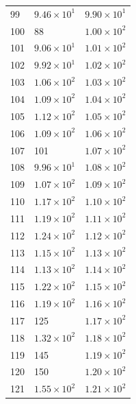 \begin{table}[H]
\begin{tabular}{lll}
99 & $\displaystyle 9.46 \times 10^{1}$ & $\displaystyle 9.90 \times 10^{1}$ \\
100 & 88 & $\displaystyle 1.00 \times 10^{2}$ \\
101 & $\displaystyle 9.06 \times 10^{1}$ & $\displaystyle 1.01 \times 10^{2}$ \\
102 & $\displaystyle 9.92 \times 10^{1}$ & $\displaystyle 1.02 \times 10^{2}$ \\
103 & $\displaystyle 1.06 \times 10^{2}$ & $\displaystyle 1.03 \times 10^{2}$ \\
104 & $\displaystyle 1.09 \times 10^{2}$ & $\displaystyle 1.04 \times 10^{2}$ \\
105 & $\displaystyle 1.12 \times 10^{2}$ & $\displaystyle 1.05 \times 10^{2}$ \\
106 & $\displaystyle 1.09 \times 10^{2}$ & $\displaystyle 1.06 \times 10^{2}$ \\
107 & 101 & $\displaystyle 1.07 \times 10^{2}$ \\
108 & $\displaystyle 9.96 \times 10^{1}$ & $\displaystyle 1.08 \times 10^{2}$ \\
109 & $\displaystyle 1.07 \times 10^{2}$ & $\displaystyle 1.09 \times 10^{2}$ \\
110 & $\displaystyle 1.17 \times 10^{2}$ & $\displaystyle 1.10 \times 10^{2}$ \\
111 & $\displaystyle 1.19 \times 10^{2}$ & $\displaystyle 1.11 \times 10^{2}$ \\
112 & $\displaystyle 1.24 \times 10^{2}$ & $\displaystyle 1.12 \times 10^{2}$ \\
113 & $\displaystyle 1.15 \times 10^{2}$ & $\displaystyle 1.13 \times 10^{2}$ \\
114 & $\displaystyle 1.13 \times 10^{2}$ & $\displaystyle 1.14 \times 10^{2}$ \\
115 & $\displaystyle 1.22 \times 10^{2}$ & $\displaystyle 1.15 \times 10^{2}$ \\
116 & $\displaystyle 1.19 \times 10^{2}$ & $\displaystyle 1.16 \times 10^{2}$ \\
117 & 125 & $\displaystyle 1.17 \times 10^{2}$ \\
118 & $\displaystyle 1.32 \times 10^{2}$ & $\displaystyle 1.18 \times 10^{2}$ \\
119 & 145 & $\displaystyle 1.19 \times 10^{2}$ \\
120 & 150 & $\displaystyle 1.20 \times 10^{2}$ \\
121 & $\displaystyle 1.55 \times 10^{2}$ & $\displaystyle 1.21 \times 10^{2}$ \\

\end{tabular}
\end{table}
